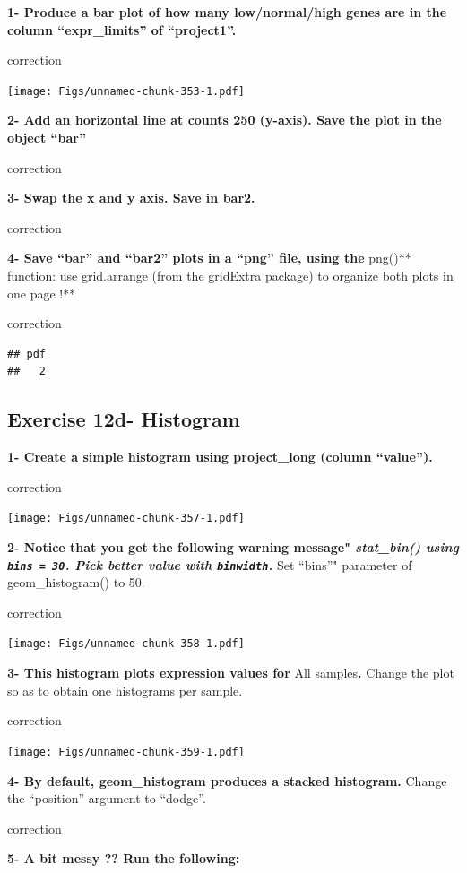 \documentclass[]{book}
\begin{document}
\textbf{1- Produce a bar plot of how many low/normal/high genes are in the column ``expr\_limits'' of ``project1''.}

correction

\texttt{[image: Figs/unnamed-chunk-353-1.pdf]}

\textbf{2- Add an horizontal line at counts 250 (y-axis). Save the plot in the object ``bar''}

correction

\textbf{3- Swap the x and y axis. Save in bar2.}

correction

\textbf{4- Save ``bar'' and ``bar2'' plots in a ``png'' file, using the }png()** function: use grid.arrange (from the gridExtra package) to organize both plots in one page !**

correction

\begin{verbatim}
## pdf 
##   2
\end{verbatim}

\hypertarget{exercise-12d--histogram}{%
\subsection{Exercise 12d- Histogram}\label{exercise-12d--histogram}}

\textbf{1- Create a simple histogram using project\_long (column ``value'').}

correction

\texttt{[image: Figs/unnamed-chunk-357-1.pdf]}

\textbf{2- Notice that you get the following warning message" \emph{stat\_bin() using \texttt{bins\ =\ 30}. Pick better value with \texttt{binwidth}.}}
Set ``bins''" parameter of geom\_histogram() to 50.

correction

\texttt{[image: Figs/unnamed-chunk-358-1.pdf]}

\textbf{3- This histogram plots expression values for }All samples\textbf{.}
Change the plot so as to obtain one histograms per sample.

correction

\texttt{[image: Figs/unnamed-chunk-359-1.pdf]}

\textbf{4- By default, geom\_histogram produces a stacked histogram.}
Change the ``position'' argument to ``dodge''.

correction

\textbf{5- A bit messy ?? Run the following:}
\end{document}
